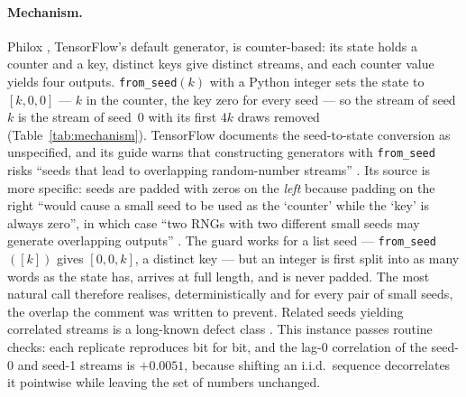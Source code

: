 \documentclass{article}
\newcommand{\fromseed}{\texttt{from\_seed}}
\begin{document}
\paragraph{Mechanism.} Philox \citep{salmon2011parallel}, TensorFlow's default generator, is
counter-based: its state holds a counter and a key, distinct keys give distinct streams, and each
counter value yields four outputs. \fromseed{}$(k)$ with a Python integer sets the state to
$[k, 0, 0]$ --- $k$ in the counter, the key zero for every seed --- so the stream of seed $k$ is
the stream of seed~0 with its first $4k$ draws removed (Table~\ref{tab:mechanism}). TensorFlow
documents the seed-to-state conversion as unspecified, and its guide warns that constructing
generators with \fromseed{} risks ``seeds that lead to overlapping random-number streams''
\citep{tensorflow2024guide}. Its source is more specific: seeds are padded with zeros on the
\emph{left} because padding on the right ``would cause a small seed to be used as the `counter'
while the `key' is always zero'', in which case ``two RNGs with two different small seeds may
generate overlapping outputs'' \citep{tensorflow2026source}. The guard works for a list seed ---
\fromseed{}$([k])$ gives $[0, 0, k]$, a distinct key --- but an integer is first split into as
many words as the state has, arrives at full length, and is never padded. The most natural call
therefore realises, deterministically and for every pair of small seeds, the overlap the comment
was written to prevent. Related seeds yielding correlated streams is a long-known defect class
\citep{matsumoto2007common}. This instance passes routine checks: each replicate reproduces bit
for bit, and the lag-0 correlation of the seed-0 and seed-1 streams is $+0.0051$, because
shifting an i.i.d.\ sequence decorrelates it pointwise while leaving the set of numbers
unchanged.
\end{document}
